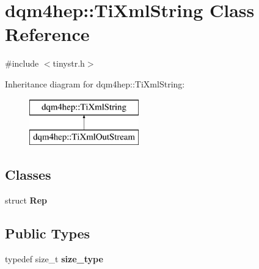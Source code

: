 \section{dqm4hep\+:\+:Ti\+Xml\+String Class Reference}
\label{classdqm4hep_1_1TiXmlString}


{\ttfamily \#include $<$tinystr.\+h$>$}

Inheritance diagram for dqm4hep\+:\+:Ti\+Xml\+String\+:\begin{figure}[H]
\begin{center}
\leavevmode
\includegraphics[height=2.000000cm]{classdqm4hep_1_1TiXmlString}
\end{center}
\end{figure}
\subsection*{Classes}
\begin{DoxyCompactItemize}
\item 
struct {\bf Rep}
\end{DoxyCompactItemize}
\subsection*{Public Types}
\begin{DoxyCompactItemize}
\item 
typedef size\+\_\+t {\bf size\+\_\+type}
\end{DoxyCompactItemize}
